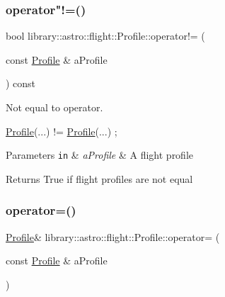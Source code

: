 \subsubsection{\texorpdfstring{operator"!=()}{operator!=()}}
{\footnotesize\ttfamily bool library\+::astro\+::flight\+::\+Profile\+::operator!= (\begin{DoxyParamCaption}\item[{const \hyperlink{classlibrary_1_1astro_1_1flight_1_1_profile}{Profile} \&}]{a\+Profile }\end{DoxyParamCaption}) const}



Not equal to operator. 


\begin{DoxyCode}
\hyperlink{classlibrary_1_1astro_1_1flight_1_1_profile_a34d66fdddf3eda9a3fed036d6b9a4363}{Profile}(...) != \hyperlink{classlibrary_1_1astro_1_1flight_1_1_profile_a34d66fdddf3eda9a3fed036d6b9a4363}{Profile}(...) ;
\end{DoxyCode}



\begin{DoxyParams}[1]{Parameters}
\mbox{\tt in}  & {\em a\+Profile} & A flight profile \\
\hline
\end{DoxyParams}
\begin{DoxyReturn}{Returns}
True if flight profiles are not equal 
\end{DoxyReturn}
\mbox{\label{classlibrary_1_1astro_1_1flight_1_1_profile_a165425746b98ee39d62052e02954f778}} 
\subsubsection{\texorpdfstring{operator=()}{operator=()}}
{\footnotesize\ttfamily \hyperlink{classlibrary_1_1astro_1_1flight_1_1_profile}{Profile}\& library\+::astro\+::flight\+::\+Profile\+::operator= (\begin{DoxyParamCaption}\item[{const \hyperlink{classlibrary_1_1astro_1_1flight_1_1_profile}{Profile} \&}]{a\+Profile }\end{DoxyParamCaption})\hspace{0.3cm}{\ttfamily [default]}}



